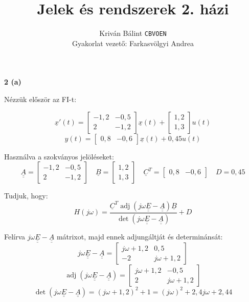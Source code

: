 \documentclass[12pt,a4paper]{article}
\title{\vspace{-2ex}Jelek és rendszerek 2. házi}
\author{Kriván Bálint \texttt{CBVOEN}\\
Gyakorlat vezető: Farkasvölgyi Andrea}
\newcommand\uuline[1]{\underline{\underline{#1}}}
\newcommand\uline[1]{\underline{#1}}
\DeclareMathOperator{\adj}{adj}
\begin{document}
\maketitle

\thispagestyle{fancy}

\textbf{2 (a)}

Nézzük először az FI-t:

\[\uline{x}'(t) = \left[\begin{matrix}-1,2 & -0,5\\2 & -1,2\end{matrix}\right]\uline{x}(t) + \left[\begin{matrix}1,2\\1,3\end{matrix}\right]u(t)\]
\[y(t) = \left[\begin{matrix}0,8 & -0,6\end{matrix}\right]\uline{x}(t) + 0,45u(t)\]

Használva a szokványos jelöléseket:
\[\uuline{A} = \left[\begin{matrix}-1,2 & -0,5\\2 & -1,2\end{matrix}\right] \quad \uline{B}=\left[\begin{matrix}1,2\\1,3\end{matrix}\right] \quad \uline{C}^T = \left[\begin{matrix}0,8 & -0,6\end{matrix}\right] \quad D = 0,45\]

Tudjuk, hogy:
\[H(j \omega) = \frac{\uline{C}^T \adj(j \omega \uuline{E}-\uuline{A})\uline{B}}{\det(j \omega \uuline{E}-\uuline{A})} + D\]

Felírva $j \omega \uuline{E}-\uuline{A}$ mátrixot, majd ennek adjungáltját és determinánsát:
\[j \omega \uuline{E}-\uuline{A} = \left[\begin{matrix}j\omega+1,2 & 0,5\\-2 & j\omega+1,2\end{matrix}\right]\]
\[\adj(j \omega \uuline{E}-\uuline{A}) = \left[\begin{matrix}j\omega+1,2 & -0,5\\2 & j\omega+1,2\end{matrix}\right]\]
\[\det(j \omega \uuline{E}-\uuline{A}) = (j\omega+1,2)^2+1 = (j\omega)^2+2,4j\omega+2,44\]
\end{document}
